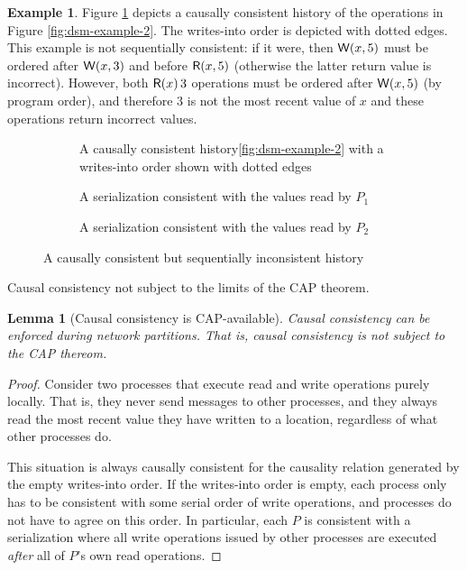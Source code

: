 \documentclass[]             %
{NASA}                       %
\newtheorem{lemma}[theorem]{Lemma}
\theoremstyle{definition}
\newtheorem{example}[theorem]{Example}
\begin{document}
\begin{example}
  \label{ex:dsm-causal-ex1}
  Figure \ref{fig:dsm-causal-ex1} depicts a causally consistent
  history of the operations in Figure \ref{fig:dsm-example-2}. The
  writes-into order is depicted with dotted edges. This example is not
  sequentially consistent: if it were, then $\mathsf{W}\!\left(x, 5\right)$ must be
  ordered after $\mathsf{W}\!\left(x, 3\right)$ and before $\mathsf{R}\!\left(x, 5\right)$
  (otherwise the latter return value is incorrect). However, both
  $\mathsf{R}\!\left(x\right){3}$ operations must be ordered after $\mathsf{W}\!\left(x, 5\right)$
  (by program order), and therefore $3$ is not the most recent value
  of $x$ and these operations return incorrect values.
\end{example}

\begin{figure}
  \setlength\belowcaptionskip{5ex}
  \begin{subfigure}{1\textwidth}
    \centering
    
    \caption{A causally consistent history\ref{fig:dsm-example-2} with a writes-into order shown with dotted edges}
    \label{fig:dsm-causal-ex1}
  \end{subfigure}
  \begin{subfigure}{1\textwidth}
    \centering
    
    \caption{A serialization consistent with the values read by $P_1$}
    \label{fig:dsm-causal-ex1-serial1}
  \end{subfigure}
  \begin{subfigure}{1\textwidth}
    \centering
    
    \caption{A serialization consistent with the values read by $P_2$}
    \label{fig:dsm-causal-ex1-serial2}
  \end{subfigure}
  \caption{A causally consistent but sequentially inconsistent history}
\end{figure}

Causal consistency not subject to the limits of the CAP theorem.

\begin{lemma}[Causal consistency is CAP-available]
  \label{thm:cap-causal}
  Causal consistency can be enforced during network partitions. That
  is, causal consistency is not subject to the CAP thereom.
\end{lemma}
\begin{proof}
  Consider two processes that execute read and write operations purely
  locally. That is, they never send messages to other processes, and
  they always read the most recent value they have written to a
  location, regardless of what other processes do.

  This situation is always causally consistent for the causality
  relation generated by the empty writes-into order. If the
  writes-into order is empty, each process only has to be consistent
  with some serial order of write operations, and processes do not
  have to agree on this order. In particular, each $P$ is
  consistent with a serialization where all write operations issued by
  other processes are executed \emph{after} all of $P$'s own read
  operations.
\end{proof}
\end{document}
